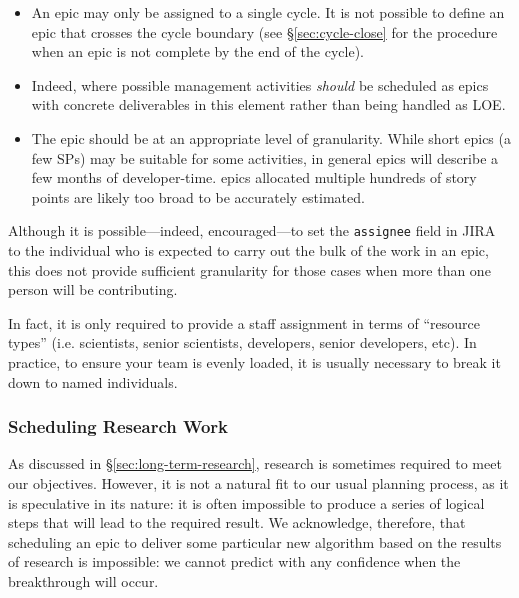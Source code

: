 \begin{itemize}
\item An \gls{epic} may only be assigned to a single \gls{cycle}.
  It is not possible to define an \gls{epic} that crosses the \gls{cycle} boundary (see \S\ref{sec:cycle-close} for the procedure when an \gls{epic} is not complete by the end of the \gls{cycle}).
\item Indeed, where possible management activities \emph{should} be scheduled as \glspl{epic} with concrete deliverables in this \gls{element} rather than being handled as \gls{LOE}.
\item The \gls{epic} should be at an appropriate level of granularity.
  While short \glspl{epic} (a few \glspl{SP}) may be suitable for some activities, in general \glspl{epic} will describe a few months of developer-time.
  \Glspl{epic} allocated multiple hundreds of \gls{story} points are likely too broad to be accurately estimated.
\end{itemize}


Although it is possible---indeed, encouraged---to set the \texttt{assignee} field in \gls{JIRA} to the individual who is expected to carry out the bulk of the work in an \gls{epic}, this does not provide sufficient granularity for those cases when more than one person will be contributing.

In fact, it is only required to provide a staff assignment in terms of ``resource types'' (i.e. scientists, senior scientists, developers, senior developers, etc).
In practice, to ensure your team is evenly loaded, it is usually necessary to break it down to named individuals.


\subsubsection{Scheduling Research Work} \label{sec:research}

As discussed in \S\ref{sec:long-term-research}, research is sometimes required
to meet our objectives. However, it is not a natural fit to our usual
planning process, as it is speculative in its nature: it is often
impossible to produce a series of logical steps that will lead to the
required result. We acknowledge, therefore, that scheduling an \gls{epic} to
deliver some particular new \gls{algorithm} based on the results of research
is impossible: we cannot predict with any confidence when the
breakthrough will occur.

